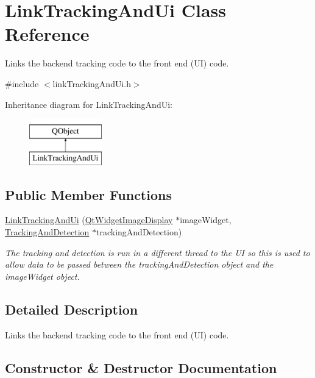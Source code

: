 \hypertarget{class_link_tracking_and_ui}{}\section{Link\+Tracking\+And\+Ui Class Reference}
\label{class_link_tracking_and_ui}


Links the backend tracking code to the front end (U\+I) code.  




{\ttfamily \#include $<$link\+Tracking\+And\+Ui.\+h$>$}

Inheritance diagram for Link\+Tracking\+And\+Ui\+:\begin{figure}[H]
\begin{center}
\leavevmode
\includegraphics[height=2.000000cm]{class_link_tracking_and_ui}
\end{center}
\end{figure}
\subsection*{Public Member Functions}
\begin{DoxyCompactItemize}
\item 
\hyperlink{class_link_tracking_and_ui_a6f4f4209f002459ac29511c55d9b4780}{Link\+Tracking\+And\+Ui} (\hyperlink{class_qt_widget_image_display}{Qt\+Widget\+Image\+Display} $\ast$image\+Widget, \hyperlink{class_tracking_and_detection}{Tracking\+And\+Detection} $\ast$tracking\+And\+Detection)
\begin{DoxyCompactList}\small\item\em The tracking and detection is run in a different thread to the U\+I so this is used to allow data to be passed between the tracking\+And\+Detection object and the image\+Widget object. \end{DoxyCompactList}\end{DoxyCompactItemize}


\subsection{Detailed Description}
Links the backend tracking code to the front end (U\+I) code. 

\subsection{Constructor \& Destructor Documentation}
\hypertarget{class_link_tracking_and_ui_a6f4f4209f002459ac29511c55d9b4780}{}
